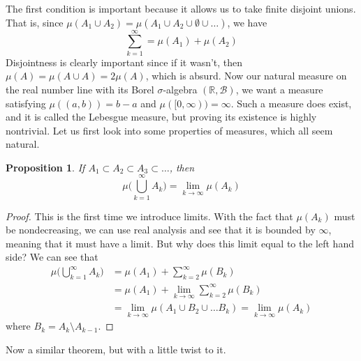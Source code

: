 \documentclass{article}
\newtheorem{proposition}[theorem]{Proposition}
\theoremstyle{remark}
\theoremstyle{definition}
\begin{document}
The first condition is important because it allows us to take finite disjoint unions. That is, since $\mu(A_1 \cup A_2) = \mu(A_1 \cup A_2 \cup \emptyset \cup \ldots)$, we have 
\[\sum_{k=1}^\infty = \mu(A_1) + \mu(A_2)\]
Disjointness is clearly important since if it wasn't, then $\mu(A) = \mu(A \cup A) = 2 \mu(A)$, which is absurd. Now our natural measure on the real number line with its Borel $\sigma$-algebra $(\mathbb{R}, \mathcal{B})$, we want a measure satisfying $\mu((a, b)) = b - a$ and $\mu([0, \infty)) = \infty$. Such a measure does exist, and it is called the Lebesgue measure, but proving its existence is highly nontrivial. Let us first look into some properties of measures, which all seem natural. 

\begin{proposition}
If $A_1 \subset A_2 \subset A_3 \subset \ldots$, then 
\[\mu\bigg( \bigcup_{k=1}^\infty A_k \bigg) = \lim_{k \rightarrow \infty} \mu(A_k)\]
\end{proposition}
\begin{proof}
This is the first time we introduce limits. With the fact that $\mu(A_k)$ must be nondecreasing, we can use real analysis and see that it is bounded by $\infty$, meaning that it must have a limit. But why does this limit equal to the left hand side? We can see that 
\begin{align}
    \mu\bigg( \bigcup_{k=1}^\infty A_k \bigg) & = \mu(A_1) + \sum_{k=2}^\infty \mu(B_k) \\
    & = \mu(A_1) + \lim_{k \rightarrow \infty} \sum_{k=2}^\infty \mu(B_k) \\
    & = \lim_{k \rightarrow \infty} \mu(A_1 \cup B_2 \cup \ldots B_k)  = \lim_{k \rightarrow \infty} \mu(A_k) 
\end{align}
where $B_k = A_k \setminus A_{k-1}$. 
\end{proof}

Now a similar theorem, but with a little twist to it. 
\end{document}
